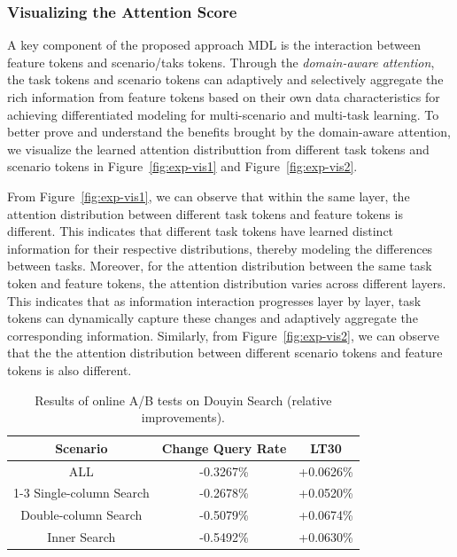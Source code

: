 \subsubsection{Visualizing the Attention Score}
A key component of the proposed approach MDL is the interaction between feature tokens and scenario/taks tokens.
Through the \emph{domain-aware attention}, the task tokens and scenario tokens can adaptively and selectively aggregate the rich information from feature tokens based on their own data characteristics for achieving differentiated modeling for multi-scenario and multi-task learning.
To better prove and understand the benefits brought by the domain-aware attention, we visualize the learned attention distributtion from different task tokens and scenario tokens in Figure~\ref{fig:exp-vis1} and Figure~\ref{fig:exp-vis2}.

From Figure~\ref{fig:exp-vis1}, we can observe that within the same layer, the attention distribution between different task tokens and feature tokens is different.
This indicates that different task tokens have learned distinct information for their respective distributions, thereby modeling the differences between tasks.
Moreover, for the attention distribution between the same task token and feature tokens, the attention distribution varies across different layers.
This indicates that as information interaction progresses layer by layer, task tokens can dynamically capture these changes and adaptively aggregate the corresponding information.
Similarly, from Figure~\ref{fig:exp-vis2}, we can observe that the the attention distribution between different scenario tokens and feature tokens is also different.


\begin{table}[t]
    \centering
    \caption{Results of online A/B tests on Douyin Search (relative improvements).}
    \label{tab:online}
        \begin{tabular}{ccc}
            \toprule
            Scenario & Change Query Rate & LT30 \\
            \midrule
            ALL & -0.3267\% & +0.0626\%  \\
            \cmidrule{1-3}
            Single-column Search & -0.2678\% & +0.0520\%  \\
            Double-column Search & -0.5079\% & +0.0674\%  \\
            Inner Search & -0.5492\% & +0.0630\%  \\
            \bottomrule
        \end{tabular}
\end{table}

